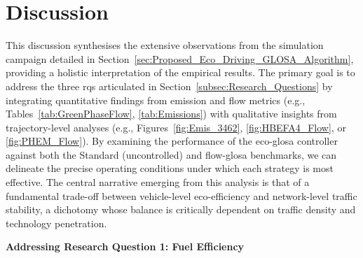 \section{Discussion}
\label{sec:Results_Discussion}

This discussion synthesises the extensive observations from the simulation campaign detailed in Section~\ref{sec:Proposed_Eco_Driving_GLOSA_Algorithm}, providing a holistic interpretation of the empirical results. The primary goal is to address the three \acp{rq} articulated in Section~\ref{subsec:Research_Questions} by integrating quantitative findings from emission and flow metrics (e.g., Tables~\ref{tab:GreenPhaseFlow}, \ref{tab:Emissions}) with qualitative insights from trajectory-level analyses (e.g., Figures~\ref{fig:Emis_3462}, \ref{fig:HBEFA4_Flow}, or \ref{fig:PHEM_Flow}). By examining the performance of the \ac{eco-glosa} controller against both the Standard (uncontrolled) and \ac{flow-glosa} benchmarks, we can delineate the precise operating conditions under which each strategy is most effective. The central narrative emerging from this analysis is that of a fundamental trade-off between vehicle-level eco-efficiency and network-level traffic stability, a dichotomy whose balance is critically dependent on traffic density and technology penetration.

\bigskip
\textbf{Addressing Research Question 1: Fuel Efficiency}

